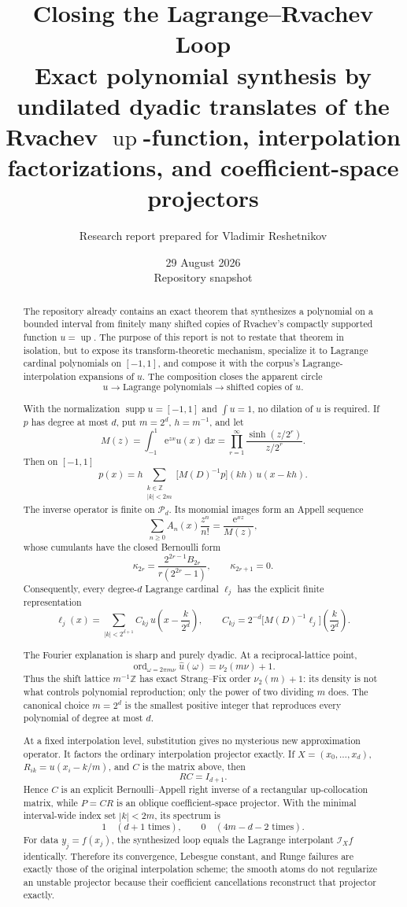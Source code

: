 \documentclass[11pt,oneside]{book}
\title{\textbf{Closing the Lagrange--Rvachev Loop}\\[0.35em]
\Large Exact polynomial synthesis by undilated dyadic translates of the Rvachev \(\operatorname{up}\)-function, interpolation factorizations, and coefficient-space projectors}
\author{Research report prepared for Vladimir Reshetnikov}
\date{29 August 2026\\Repository snapshot \RepoCommit}
\theoremstyle{definition}
\theoremstyle{remark}
\DeclareMathOperator{\supp}{supp}
\DeclareMathOperator{\ord}{ord}
\newcommand{\Z}{\mathbb Z}
\newcommand{\vtwo}{\nu_2}
\newcommand{\dd}{\,\mathrm d}
\newcommand{\e}{\mathrm e}
\begin{document}
\frontmatter
\maketitle

\begin{abstract}
The repository already contains an exact theorem that synthesizes a polynomial on a bounded interval from finitely many shifted copies of Rvachev's compactly supported function \(u=\operatorname{up}\).  The purpose of this report is not to restate that theorem in isolation, but to expose its transform-theoretic mechanism, specialize it to Lagrange cardinal polynomials on \([-1,1]\), and compose it with the corpus's Lagrange-interpolation expansions of \(u\).  The composition closes the apparent circle
\[
  u \longrightarrow \text{Lagrange polynomials}
  \longrightarrow \text{shifted copies of }u.
\]

With the normalization \(\supp u=[-1,1]\) and \(\int u=1\), no dilation of \(u\) is required.  If \(p\) has degree at most \(d\), put \(m=2^d\), \(h=m^{-1}\), and let
\[
  M(z)=\int_{-1}^{1}\e^{zx}u(x)\dd x
      =\prod_{r=1}^{\infty}\frac{\sinh(z/2^r)}{z/2^r}.
\]
Then on \([-1,1]\)
\[
  p(x)=h\sum_{\substack{k\in\Z\\ |k|<2m}}
  \bigl[M(D)^{-1}p\bigr](kh)\,u(x-kh).
\]
The inverse operator is finite on \(\mathcal P_d\).  Its monomial images form an Appell sequence
\[
  \sum_{n\ge0}A_n(x)\frac{z^n}{n!}=\frac{\e^{xz}}{M(z)},
\]
whose cumulants have the closed Bernoulli form
\[
  \kappa_{2r}=\frac{2^{2r-1}B_{2r}}{r(2^{2r}-1)},\qquad \kappa_{2r+1}=0.
\]
Consequently, every degree-\(d\) Lagrange cardinal \(\ell_j\) has the explicit finite representation
\[
  \ell_j(x)=\sum_{|k|<2^{d+1}} C_{kj}\,u\!\left(x-\frac{k}{2^d}\right),
  \qquad
  C_{kj}=2^{-d}\bigl[M(D)^{-1}\ell_j\bigr]\!\left(\frac{k}{2^d}\right).
\]

The Fourier explanation is sharp and purely dyadic.  At a reciprocal-lattice point,
\[
 \ord_{\omega=2\pi m\nu}\widehat u(\omega)=\vtwo(m\nu)+1.
\]
Thus the shift lattice \(m^{-1}\Z\) has exact Strang--Fix order \(\vtwo(m)+1\): its density is not what controls polynomial reproduction; only the power of two dividing \(m\) does.  The canonical choice \(m=2^d\) is the smallest positive integer that reproduces every polynomial of degree at most \(d\).

At a fixed interpolation level, substitution gives no mysterious new approximation operator.  It factors the ordinary interpolation projector exactly.  If \(X=(x_0,\ldots,x_d)\), \(R_{ik}=u(x_i-k/m)\), and \(C\) is the matrix above, then
\[
  RC=I_{d+1}.
\]
Hence \(C\) is an explicit Bernoulli--Appell right inverse of a rectangular up-collocation matrix, while \(P=CR\) is an oblique coefficient-space projector.  With the minimal interval-wide index set \(|k|<2m\), its spectrum is
\[
  1\quad(d+1\text{ times}),\qquad
  0\quad(4m-d-2\text{ times}).
\]
For data \(y_j=f(x_j)\), the synthesized loop equals the Lagrange interpolant \(\mathcal I_Xf\) identically.  Therefore its convergence, Lebesgue constant, and Runge failures are exactly those of the original interpolation scheme; the smooth atoms do not regularize an unstable projector because their coefficient cancellations reconstruct that projector exactly.


\end{abstract}
\end{document}
